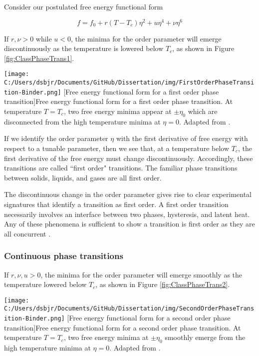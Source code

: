 Consider our postulated free energy functional form

\begin{equation}
f = f_{0} + r(T-T_{c}) \eta^{2} + u \eta^{4} + \nu \eta^{6}
\end{equation}

If $r,\nu > 0$ while $u < 0$, the minima for the order parameter will emerge discontinuously as the temperature is lowered below $T_{c}$, as shown in Figure \ref{fig:ClassPhaseTrans1}.

\begin{centering}
\texttt{[image: C:/Users/dsbjr/Documents/GitHub/Dissertation/img/FirstOrderPhaseTransition-Binder.png]}
  \captionsetup{width=0.9\textwidth}
  [Free energy functional form for a first order phase transition]{Free energy functional form for a first order phase transition. At temperature  $T = T_{c}$, two free energy minima appear at $\pm \eta_{0}$ which are disconnected from the high temperature minima at $\eta = 0$.  Adapted from \cite{Binder1987}.}
  \label{fig:ClassPhaseTrans1}
\end{centering}

If we identify the order parameter $\eta$ with the first derivative of free energy with respect to a tunable parameter, then we see that, at a temperature below $T_{c}$, the first derivative of the free energy must change discontinuously. Accordingly, these transitions are called ``first order" transitions. The familiar phase transitions between solids, liquids, and gases are all first order. 

The discontinuous change in the order parameter gives rise to clear experimental signatures that identify a transition as first order. A first order transition necessarily involves an interface between two phases, hysteresis, and latent heat. Any of these phenomena is sufficient to show a transition is first order as they are all concurrent \cite{Mnyukh2011}.

\subsubsection{Continuous phase transitions}

If $r,\nu,u > 0$, the minima for the order parameter will emerge smoothly as the temperature lowered below $T_{c}$, as shown in Figure \ref{fig:ClassPhaseTrans2}.

\begin{centering}
\texttt{[image: C:/Users/dsbjr/Documents/GitHub/Dissertation/img/SecondOrderPhaseTransition-Binder.png]}
  \captionsetup{width=0.9\textwidth}
  [Free energy functional form for a second order phase transition]{Free energy functional form for a second order phase transition. At temperature  $T = T_{c}$, two free energy minima at $\pm \eta_{0}$ smoothly emerge from the high temperature minima at $\eta = 0$.  Adapted from \cite{Binder1987}.}
  \label{fig:ClassPhaseTrans2}
\end{centering}

